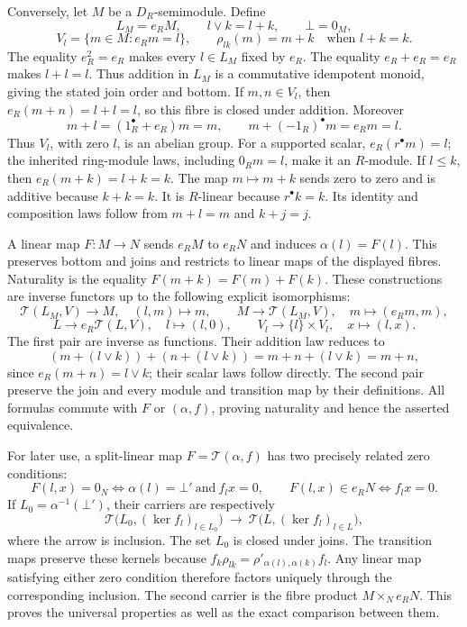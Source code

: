 Conversely, let \(M\) be a \(D_R\)-semimodule. Define
\[
L_M=e_RM,\qquad l\vee k=l+k,\qquad \bot=0_M,
\]
\[
V_l=\{m\in M:e_Rm=l\},\qquad
\rho_{lk}(m)=m+k\quad\text{when }l+k=k.
\]
The equality \(e_R^2=e_R\) makes every \(l\in L_M\) fixed by \(e_R\).
The equality \(e_R+e_R=e_R\) makes \(l+l=l\). Thus addition in \(L_M\)
is a commutative idempotent monoid, giving the stated join order and
bottom. If \(m,n\in V_l\), then \(e_R(m+n)=l+l=l\), so this fibre is
closed under addition. Moreover
\[
m+l=(1_R^\bullet+e_R)m=m,\qquad
m+(-1_R)^\bullet m=e_Rm=l.
\]
Thus \(V_l\), with zero \(l\), is an abelian group. For a supported
scalar, \(e_R(r^\bullet m)=l\); the inherited ring-module laws,
including \(0_Rm=l\), make it an \(R\)-module.
If \(l\le k\), then \(e_R(m+k)=l+k=k\). The map \(m\mapsto m+k\)
sends zero to zero and is additive because \(k+k=k\). It is
\(R\)-linear because \(r^\bullet k=k\). Its identity and composition
laws follow from \(m+l=m\) and \(k+j=j\).

A linear map \(F:M\to N\) sends \(e_RM\) to \(e_RN\) and induces
\(\alpha(l)=F(l)\). This preserves bottom and joins and restricts to
linear maps of the displayed fibres. Naturality is the equality
\(F(m+k)=F(m)+F(k)\). These constructions are inverse functors up to
the following explicit isomorphisms:
\[
\mathcal T(L_M,V)\longrightarrow M,\quad(l,m)\longmapsto m,
\qquad
M\longrightarrow\mathcal T(L_M,V),\quad m\longmapsto(e_Rm,m),
\]
\[
L\longrightarrow e_R\mathcal T(L,V),\quad l\longmapsto(l,0),
\qquad V_l\longrightarrow\{l\}\times V_l,\quad x\longmapsto(l,x).
\]
The first pair are inverse as functions. Their addition law reduces
to
\[
(m+(l\vee k))+(n+(l\vee k))
=m+n+(l\vee k)=m+n,
\]
since \(e_R(m+n)=l\vee k\); their scalar laws follow directly.
The second pair preserve the join and every module and transition
map by their definitions. All formulas commute with \(F\) or
\((\alpha,f)\), proving naturality and hence the asserted equivalence.

For later use, a split-linear map \(F=\mathcal T(\alpha,f)\) has
two precisely related zero conditions:
\[
F(l,x)=0_N
\iff \alpha(l)=\bot'\ \text{and}\ f_lx=0,\qquad
F(l,x)\in e_RN\iff f_lx=0.
\]
If \(L_0=\alpha^{-1}(\bot')\), their carriers are respectively
\[
\mathcal T\bigl(L_0,(\ker f_l)_{l\in L_0}\bigr)
\ \longrightarrow\
\mathcal T\bigl(L,(\ker f_l)_{l\in L}\bigr),
\]
where the arrow is inclusion. The set \(L_0\) is closed under joins.
The transition maps preserve these kernels because
\(f_k\rho_{lk}=\rho'_{\alpha(l),\alpha(k)}f_l\).
Any linear map satisfying either zero condition therefore factors
uniquely through the corresponding inclusion. The second carrier is
the fibre product \(M\times_N e_RN\). This proves the universal
properties as well as the exact comparison between them.

